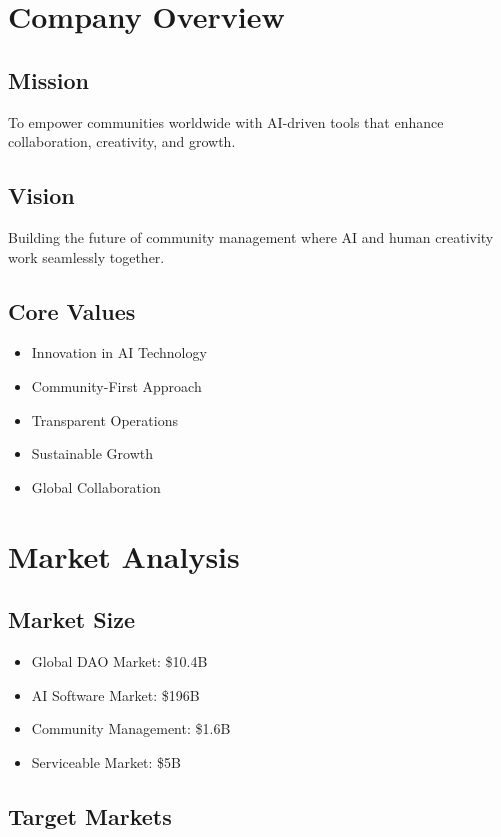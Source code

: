 \documentclass[11pt]{article}
\begin{document}
\section{Company Overview}

\subsection{Mission}
To empower communities worldwide with AI-driven tools that enhance collaboration, creativity, and growth.

\subsection{Vision}
Building the future of community management where AI and human creativity work seamlessly together.

\subsection{Core Values}
\begin{itemize}
    \item Innovation in AI Technology
    \item Community-First Approach
    \item Transparent Operations
    \item Sustainable Growth
    \item Global Collaboration
\end{itemize}

\section{Market Analysis}

\subsection{Market Size}
\begin{itemize}
    \item Global DAO Market: \$10.4B
    \item AI Software Market: \$196B
    \item Community Management: \$1.6B
    \item Serviceable Market: \$5B
\end{itemize}

\subsection{Target Markets}
\end{document}
